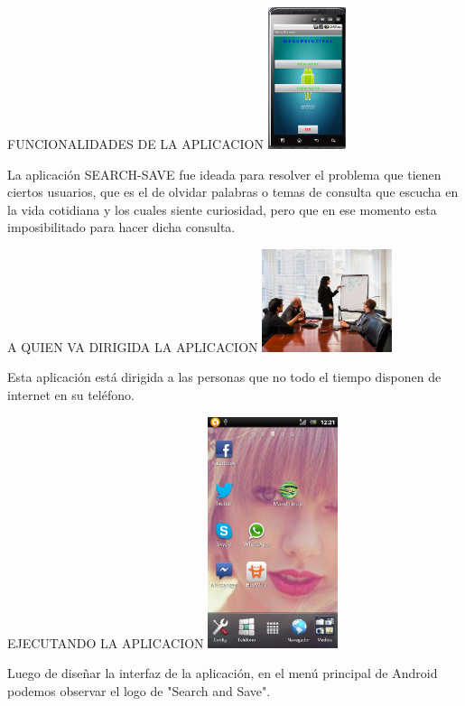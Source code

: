 \documentclass{beamer}
\begin{document}
	\begin{frame}{FUNCIONALIDADES DE LA APLICACION}
		\centering
  		\includegraphics[totalheight=1.4in,width=0.9in]{menu}
  		\begin{block}{}
  		La aplicación SEARCH-SAVE fue ideada para resolver el problema que tienen ciertos usuarios, que es el de olvidar palabras o temas de consulta que escucha en la vida cotidiana y los cuales siente curiosidad, pero que en ese momento esta imposibilitado para hacer dicha consulta.
  		\end{block}				
	\end{frame}
	
	\begin{frame}{A QUIEN VA DIRIGIDA LA APLICACION}
		\centering
  		\includegraphics[totalheight=1in,width=1.5in]{meeting}	
  		\begin{block}{}
  		Esta aplicación está dirigida a las personas que no todo el tiempo disponen de internet en su teléfono.
  		\end{block}				
	\end{frame}
	

	\begin{frame}{EJECUTANDO LA APLICACION}
		\centering
  		\includegraphics[totalheight=2in,width=1.5in]{menuand}	
  		\begin{block}{}
  		Luego de diseñar la interfaz de la aplicación, en el menú principal de Android podemos observar el logo de "Search and Save".
		\end{block}
	\end{frame}
\end{document}
